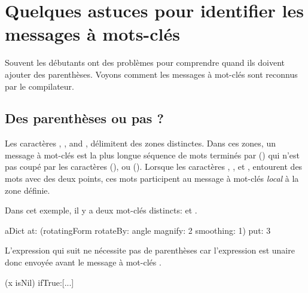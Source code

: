 \documentclass[a4paper,10pt,twoside]{book}
\begin{document}
\section{Quelques astuces pour identifier les messages \`a mots-cl\'es}
Souvent les d\'ebutants ont des probl\`emes pour comprendre quand ils doivent ajouter des parenth\`eses. Voyons comment les messages \`a mot-cl\'es sont reconnus par le compilateur.

\subsection{Des parenth\`eses ou pas ?}
Les caract\`eres \ct{[}, \ct{]}, and \ct{(}, \ct{)} 
d\'elimitent des zones distinctes. Dans ces zones, un message \`a mot-cl\'es est la plus longue s\'equence de mots termin\'es par (\ct{:}) qui n'est pas coup\'e par les caract\`eres (), ou (\ct{;}). 
Lorsque les caract\`eres \ct{[}, \ct{]}, et \ct{(}, \ct{)} entourent des mots avec des deux points, ces mots participent au message \`a mot-cl\'es \emph{local} \`a la zone d\'efinie.

Dans cet exemple, il y a deux mot-cl\'es distincts:  et .

\begin{code}{}
aDict
   at: (rotatingForm 
          rotateBy: angle	
          magnify: 2 
          smoothing: 1)
   put: 3
\end{code}




L'expression qui suit ne n\'ecessite pas de parenth\`eses car l'expression  est unaire donc envoy\'ee avant le message \`a mot-cl\'es \mbox{.}
\begin{code}{}
(x isNil)
   ifTrue:[...]
\end{code}
\end{document}
